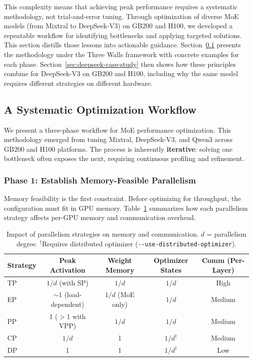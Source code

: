 \documentclass[10pt,logo,copyright]{nvidiatechreport}
\begin{document}
This complexity means that achieving peak performance requires a systematic methodology, not trial-and-error tuning. Through optimization of diverse MoE models (from Mixtral to DeepSeek-V3) on GB200 and H100, we developed a repeatable workflow for identifying bottlenecks and applying targeted solutions. This section distills those lessons into actionable guidance. Section~\ref{sec:best-practices-methodology} presents the methodology under the Three Walls framework with concrete examples for each phase. Section~\ref{sec:deepseek-case-study} then shows how these principles combine for DeepSeek-V3 on GB200 and H100, including why the same model requires different strategies on different hardware.

\subsection{A Systematic Optimization Workflow}\label{sec:best-practices-methodology}

We present a three-phase workflow for MoE performance optimization. This methodology emerged from tuning Mixtral, DeepSeek-V3, and Qwen3 across GB200 and H100 platforms. The process is inherently \textbf{iterative}: solving one bottleneck often exposes the next, requiring continuous profiling and refinement.

\subsubsection{Phase 1: Establish Memory-Feasible Parallelism}

Memory feasibility is the first constraint. Before optimizing for throughput, the configuration must fit in GPU memory. Table~\ref{tab:parallel-memory-impact} summarizes how each parallelism strategy affects per-GPU memory and communication overhead.

\begin{table}[ht]
\centering
\caption{Impact of parallelism strategies on memory and communication. $d$ = parallelism degree. $^\dagger$Requires distributed optimizer (\texttt{-{}-use-distributed-optimizer}).}
\label{tab:parallel-memory-impact}
\begin{tabular}{lcccc}
\toprule
\textbf{Strategy} & \textbf{Peak Activation} & \textbf{Weight Memory} & \textbf{Optimizer States} & \textbf{Comm (Per-Layer)} \\
\midrule
TP & $1/d$ (with SP) & $1/d$ & $1/d$ & High \\
EP & $\sim$1 (load-dependent) & $1/d$ (MoE only) & $1/d$ & Medium \\
PP & 1 ($>$1 with VPP) & $1/d$ & $1/d$ & Medium \\
CP & $1/d$ & 1 & $1/d^\dagger$ & Medium \\
DP & 1 & 1 & $1/d^\dagger$ & Low \\
\bottomrule
\end{tabular}
\end{table}
\end{document}
